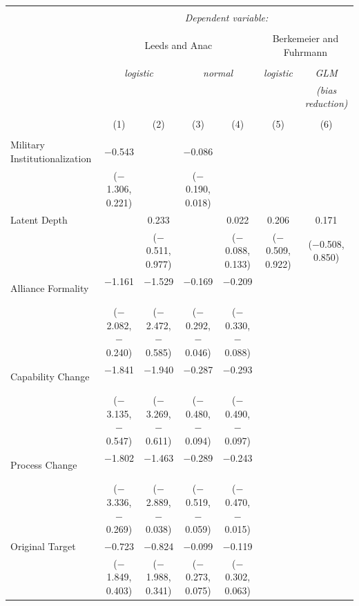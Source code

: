 \documentclass[12pt]{article}
\begin{document}
\begin{table}[!htbp] \centering 
\begin{adjustbox}{width= .95\textwidth, center}
\begin{tabular}{@{\extracolsep{5pt}}lcccccc} 
\\[-1.8ex]\hline 
\hline \\[-1.8ex] 
 & \multicolumn{6}{c}{\textit{Dependent variable:}} \\ 
\cline{2-7} 
\\[-1.8ex] & \multicolumn{4}{c}{Leeds and Anac} & \multicolumn{2}{c}{Berkemeier and Fuhrmann} \\ 
\\[-1.8ex] & \multicolumn{2}{c}{\textit{logistic}} & \multicolumn{2}{c}{\textit{normal}} & \textit{logistic} & \textit{GLM} \\ 
 & \multicolumn{2}{c}{\textit{}} & \multicolumn{2}{c}{\textit{}} & \textit{} & \textit{(bias reduction)} \\ 
\\[-1.8ex] & (1) & (2) & (3) & (4) & (5) & (6)\\ 
\hline \\[-1.8ex] 
 Military Institutionalization & $-$0.543 &  & $-$0.086 &  &  &  \\ 
  & ($-$1.306, 0.221) &  & ($-$0.190, 0.018) &  &  &  \\ 
  Latent Depth &  & 0.233 &  & 0.022 & 0.206 & 0.171 \\ 
  &  & ($-$0.511, 0.977) &  & ($-$0.088, 0.133) & ($-$0.509, 0.922) & ($-$0.508, 0.850) \\ 
  Alliance Formality & $-$1.161$^{}$ & $-$1.529$^{}$ & $-$0.169$^{}$ & $-$0.209$^{}$ &  &  \\ 
  & ($-$2.082, $-$0.240) & ($-$2.472, $-$0.585) & ($-$0.292, $-$0.046) & ($-$0.330, $-$0.088) &  &  \\ 
  Capability Change & $-$1.841$^{}$ & $-$1.940$^{}$ & $-$0.287$^{}$ & $-$0.293$^{}$ &  &  \\ 
  & ($-$3.135, $-$0.547) & ($-$3.269, $-$0.611) & ($-$0.480, $-$0.094) & ($-$0.490, $-$0.097) &  &  \\ 
  Process Change & $-$1.802$^{}$ & $-$1.463$^{}$ & $-$0.289$^{}$ & $-$0.243$^{}$ &  &  \\ 
  & ($-$3.336, $-$0.269) & ($-$2.889, $-$0.038) & ($-$0.519, $-$0.059) & ($-$0.470, $-$0.015) &  &  \\ 
  Original Target & $-$0.723 & $-$0.824 & $-$0.099 & $-$0.119 &  &  \\ 
  & ($-$1.849, 0.403) & ($-$1.988, 0.341) & ($-$0.273, 0.075) & ($-$0.302, 0.063) &  &  \\ 

\end{tabular}
\end{adjustbox}
\end{table}
\end{document}
